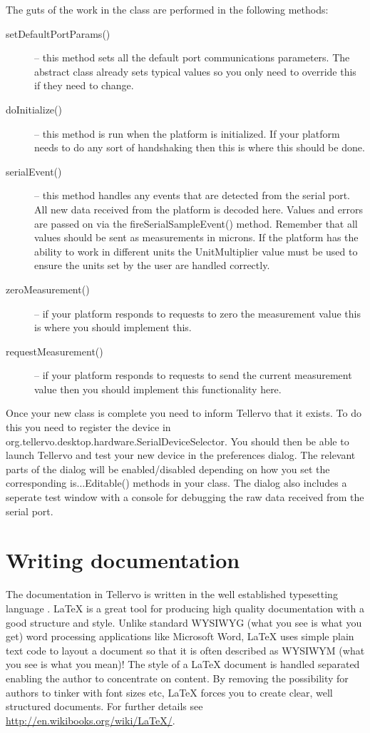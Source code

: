 The guts of the work in the class are performed in the following methods:

\begin{description}
 \item[setDefaultPortParams()] -- this method sets all the default port communications parameters.  The abstract class already sets typical values so you only need to override this if they need to change.
 \item[doInitialize()] -- this method is run when the platform is initialized.  If your platform needs to do any sort of handshaking then this is where this should be done.
 \item[serialEvent()] -- this method handles any events that are detected from the serial port.  All new data received from the platform is decoded here.  Values and errors are passed on via the fireSerialSampleEvent() method.  Remember that all values should be sent as measurements in microns.  If the platform has the ability to work in different units the UnitMultiplier value must be used to ensure the units set by the user are handled correctly.
 \item[zeroMeasurement()] -- if your platform responds to requests to zero the measurement value this is where you should implement this.  
 \item[requestMeasurement()] -- if your platform responds to requests to send the current measurement value then you should implement this functionality here.
\end{description} 

Once your new class is complete you need to inform Tellervo that it exists.  To do this you need to register the device in org.tellervo.desktop.hardware.SerialDeviceSelector.  You should then be able to launch Tellervo and test your new device in the preferences dialog.  The relevant parts of the dialog will be enabled/disabled depending on how you set the corresponding is$\ldots$Editable() methods in your class.  The dialog also includes a seperate test window with a console for debugging the raw data received from the serial port.  

\section{Writing documentation}
The documentation in Tellervo is written in the well established typesetting language {\LaTeXe}.  {\LaTeX} is a great tool for producing high quality documentation with a good structure and style.  Unlike standard WYSIWYG (what you see is what you get) word processing applications like Microsoft Word, {\LaTeX} uses simple plain text code to layout a document so that it is often described as WYSIWYM (what you see is what you mean)!  The style of a {\LaTeX} document is handled separated enabling the author to concentrate on content.  By removing the possibility for authors to tinker with font sizes etc, {\LaTeX} forces you to create clear, well structured documents.  For further details see \url{http://en.wikibooks.org/wiki/LaTeX/}.

